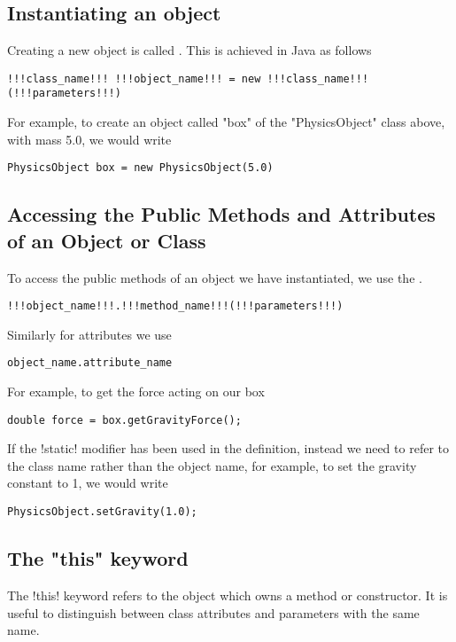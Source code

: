 \documentclass[11pt]{report}
\begin{document}
\subsection{Instantiating an object}
Creating a new object is called . This is achieved in Java as follows
\vspace{-30pt}
\begin{lstlisting}[style=javaSyntax]
!!!class_name!!! !!!object_name!!! = new !!!class_name!!!(!!!parameters!!!)
\end{lstlisting}
For example, to create an object called \inlineJava"box" of the \inlineJava"PhysicsObject" class above, with mass 5.0, we would write
\vspace{-15pt}
\begin{lstlisting}
PhysicsObject box = new PhysicsObject(5.0)
\end{lstlisting}

\subsection{Accessing the Public Methods and Attributes of an Object or Class}
To access the public methods of an object we have instantiated, we use the .
\vspace{-22pt}
\begin{lstlisting}[style=javaSyntax]
!!!object_name!!!.!!!method_name!!!(!!!parameters!!!)
\end{lstlisting}
Similarly for attributes we use
\vspace{-22pt}
\begin{lstlisting}[style=javaSyntax]
object_name.attribute_name
\end{lstlisting}
For example, to get the force acting on our box
\vspace{-15pt}
\begin{lstlisting}
double force = box.getGravityForce();
\end{lstlisting}
If the \inlineJava!static! modifier has been used in the definition, instead we need to refer to the class name rather than the object name, for example, to set the gravity constant to 1, we would write
\vspace{-15pt}
\begin{lstlisting}
PhysicsObject.setGravity(1.0);
\end{lstlisting}
\subsection{The "this" keyword}
The  \inlineJava!this! keyword refers to the object which owns a method or constructor. It is useful to distinguish between class attributes and parameters with the same name. 
\end{document}
